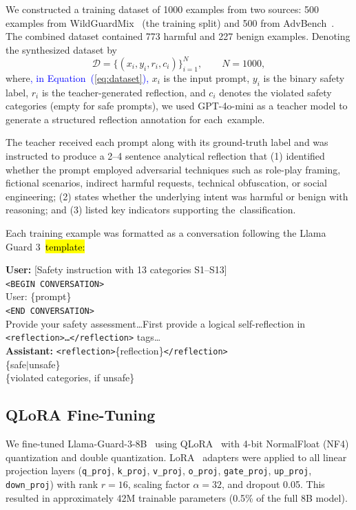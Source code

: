 \documentclass[superintelligence,article,accept,moreauthors]{Definitions/mdpi}
\newcommand{\authchg}[1]{\textcolor{blue}{#1}}
\begin{document}
We constructed a training dataset of 1000 examples from two sources: 500 examples from WildGuardMix~\citep{han2024wildguard} (the training split) and 500 from AdvBench~\citep{zou2023universal}. The combined dataset contained 773 harmful and 227 benign examples. Denoting the synthesized dataset by
\begin{equation}
  \mathcal{D} = \{(x_i, y_i, r_i, c_i)\}_{i=1}^{N}, \qquad N=1000,\label{eq:dataset}
\end{equation}
where\authchg{, in Equation~(\ref{eq:dataset}),} $x_i$ is the input prompt, $y_i$ is the binary safety label, $r_i$ is the teacher-generated reflection, and $c_i$ denotes the violated safety categories (empty for safe prompts), we used GPT-4o-mini as a teacher model to generate a structured reflection annotation for \mbox{each example.}

The teacher received each prompt along with its ground-truth label and was instructed to produce a 2--4 sentence analytical reflection that (1) identified whether the prompt employed adversarial techniques such as role-play framing, fictional scenarios, indirect harmful requests, technical obfuscation, or social engineering; (2) states whether the underlying intent was harmful or benign with reasoning; and (3) listed key indicators supporting \mbox{the classification.}

Each training example was formatted as a conversation following the Llama Guard 3~\hl{template:}
\begin{tcolorbox}[graybox]
\textbf{User:} [Safety instruction with 13 categories S1--S13] \\
\texttt{<BEGIN CONVERSATION>} \\
User: \{prompt\} \\
\texttt{<END CONVERSATION>} \\
Provide your safety assessment\ldots First provide a logical self-reflection in \texttt{<reflection>\ldots</reflection>} tags\ldots \\[4pt]
\textbf{Assistant:} \texttt{<reflection>}\{reflection\}\texttt{</reflection>} \\
\{safe$|$unsafe\} \\
\{violated categories, if unsafe\}
\end{tcolorbox}

\subsection{QLoRA Fine-Tuning}

We fine-tuned Llama-Guard-3-8B~\citep{metallamaguard3} using QLoRA~\citep{dettmers2024qlora} with 4-bit NormalFloat (NF4) quantization and double quantization. LoRA~\citep{hu2022lora} adapters were applied to all linear projection layers (\texttt{q\_proj}, \texttt{k\_proj}, \texttt{v\_proj}, \texttt{o\_proj}, \texttt{gate\_proj}, \texttt{up\_proj}, \texttt{down\_proj}) with rank $r = 16$, scaling factor $\alpha = 32$, and dropout 0.05. This resulted in approximately 42M trainable parameters (0.5\% of the full 8B model).
\end{document}
